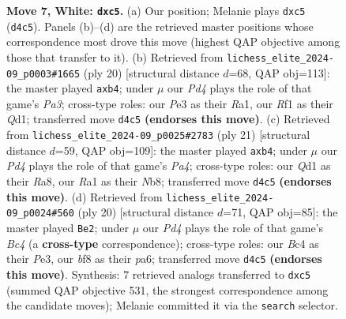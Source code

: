 \documentclass[11pt]{article}
\begin{document}
\begin{figure}[p]
\caption{\textbf{Move 7, White: \texttt{dxc5}.} (a) Our position; Melanie plays \texttt{dxc5} (\texttt{d4c5}). Panels (b)--(d) are the retrieved master positions whose correspondence most drove this move (highest QAP objective among those that transfer to it). (b) Retrieved from \texttt{lichess\_elite\_2024-09\_p0003\#1665} (ply 20) [structural distance $d$=68, QAP obj=113]: the master played \texttt{axb4}; under $\mu$ our \emph{Pd4} plays the role of that game's \emph{Pa3}; cross-type roles: our \emph{P}e3 as their \emph{R}a1, our \emph{R}f1 as their \emph{Q}d1; transferred move \texttt{d4c5} \textbf{(endorses this move)}. (c) Retrieved from \texttt{lichess\_elite\_2024-09\_p0025\#2783} (ply 21) [structural distance $d$=59, QAP obj=109]: the master played \texttt{axb4}; under $\mu$ our \emph{Pd4} plays the role of that game's \emph{Pa4}; cross-type roles: our \emph{Q}d1 as their \emph{R}a8, our \emph{R}a1 as their \emph{N}b8; transferred move \texttt{d4c5} \textbf{(endorses this move)}. (d) Retrieved from \texttt{lichess\_elite\_2024-09\_p0024\#560} (ply 20) [structural distance $d$=71, QAP obj=85]: the master played \texttt{Be2}; under $\mu$ our \emph{Pd4} plays the role of that game's \emph{Bc4} (a \textbf{cross-type} correspondence); cross-type roles: our \emph{B}c4 as their \emph{P}e3, our \emph{b}f8 as their \emph{p}a6; transferred move \texttt{d4c5} \textbf{(endorses this move)}. Synthesis: 7 retrieved analogs transferred to \texttt{dxc5} (summed QAP objective 531, the strongest correspondence among the candidate moves); Melanie committed it via the \texttt{search} selector.}
\label{fig:thought-m12}
\end{figure}

\clearpage
\end{document}
